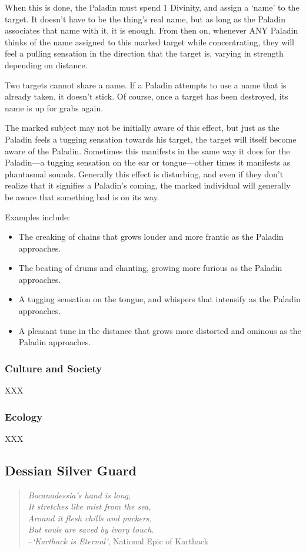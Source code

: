 \documentclass[oneside,11pt,english]{book}
\begin{document}
When this is done, the Paladin must spend 1 Divinity, and assign a ‘name’ to the target. It doesn't have to be the thing's real name, but as long as the Paladin associates that name with it, it is enough. From then on, whenever ANY Paladin thinks of the name assigned to this marked target while concentrating, they will feel a pulling sensation in the direction that the target is, varying in strength depending on distance.


Two targets cannot share a name. If a Paladin attempts to use a name that is already taken, it doesn't stick. Of course, once a target has been destroyed, its name is up for grabs again.


The marked subject may not be initially aware of this effect, but just as the Paladin feels a tugging sensation towards his target, the target will itself become aware of the Paladin.
Sometimes this manifests in the same way it does for the Paladin—a tugging sensation on the ear or tongue—other times it manifests as phantasmal sounds.
Generally this effect is disturbing, and even if they don't realize that it signifies a Paladin's coming, the marked individual will generally be aware that something bad is on its way. 


Examples include:
\begin{itemize}
\item The creaking of chains that grows louder and more frantic as the Paladin approaches. 
\item The beating of drums and chanting, growing more furious as the Paladin approaches. 
\item A tugging sensation on the tongue, and whispers that intensify as the Paladin approaches. 
\item A pleasant tune in the distance that grows more distorted and ominous as the Paladin 
approaches. 
\end{itemize}
\subsubsection*{Culture and Society} 
XXX 
\subsubsection*{Ecology} 
XXX 
\subsection{Dessian Silver Guard}
\begin{verse}
	\emph{Bocanadessia's hand is long,\\
It stretches like mist from the sea,\\
Around it flesh chills and puckers,\\
But souls are saved by ivory touch.}\\

--\textit{‘Karthack is Eternal’}, National Epic of Karthack
\end{verse}
\end{document}
